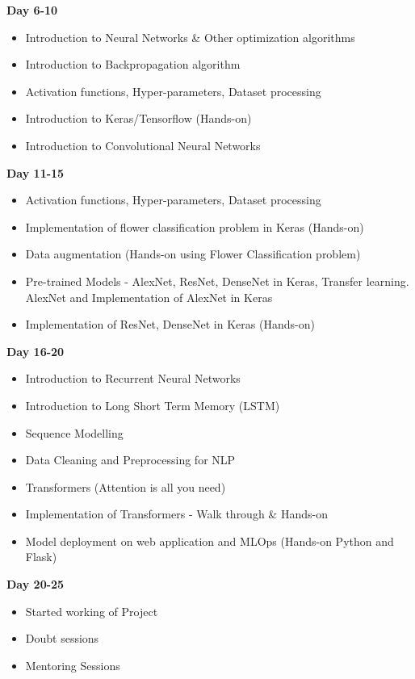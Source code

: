 \textbf{Day 6-10}
\begin{itemize}
    \item Introduction to Neural Networks \& Other optimization algorithms
    \item Introduction to Backpropagation algorithm
    \item Activation functions, Hyper-parameters, Dataset processing
    \item Introduction to Keras/Tensorflow (Hands-on)
    \item Introduction to Convolutional Neural Networks 
   
\end{itemize}
\textbf{Day 11-15}
\begin{itemize}
    \item Activation functions, Hyper-parameters, Dataset processing 
    \item Implementation of flower classification problem in Keras (Hands-on)
    \item Data augmentation (Hands-on using Flower Classification problem)
    \item Pre-trained Models - AlexNet, ResNet, DenseNet in Keras, Transfer learning. AlexNet and Implementation of AlexNet in Keras
    \item Implementation of ResNet, DenseNet in Keras (Hands-on)
\end{itemize}
\textbf{Day 16-20}
\begin{itemize}
    \item Introduction to Recurrent Neural Networks
    \item Introduction to Long Short Term Memory (LSTM)
    \item Sequence Modelling
    \item Data Cleaning and Preprocessing for NLP
    \item Transformers (Attention is all you need)
    \item Implementation of Transformers - Walk through \& Hands-on 
    \item Model deployment on web application and MLOps (Hands-on Python and Flask)
\end{itemize}
\textbf{Day 20-25}
\begin{itemize}
    \item Started working of Project
    \item Doubt sessions
    \item Mentoring Sessions
\end{itemize}